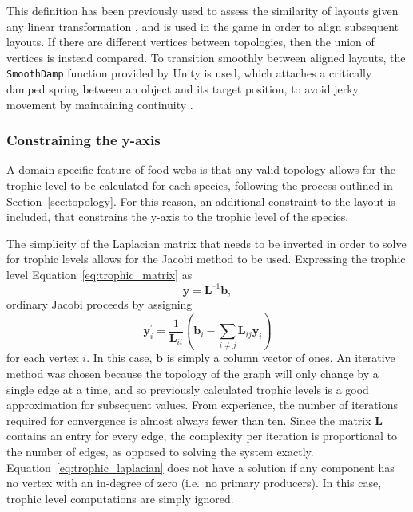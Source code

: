 This definition has been previously used to assess the similarity of layouts given any linear transformation \cite{Ortmann2017}, and is used in the game in order to align subsequent layouts. If there are different vertices between topologies, then the union of vertices is instead compared.
To transition smoothly between aligned layouts, the \texttt{SmoothDamp} function provided by Unity is used, which attaches a critically damped spring between an object and its target position, to avoid jerky movement by maintaining continuity \cite{Kirmse2004}.


\subsubsection{Constraining the y-axis}
A domain-specific feature of food webs is that any valid topology allows for the trophic level to be calculated for each species, following the process outlined in Section~\ref{sec:topology}. For this reason, an additional constraint to the layout is included, that constrains the y-axis to the trophic level of the species.

The simplicity of the Laplacian matrix that needs to be inverted in order to solve for trophic levels allows for the Jacobi method to be used. Expressing the trophic level Equation~\eqref{eq:trophic_matrix} as 
\begin{equation}
  \mathbf{y} = \mathbf{L}^{\text{--}1}\mathbf{b},
  \label{eq:trophic_laplacian}
\end{equation}
ordinary Jacobi proceeds by assigning
\begin{equation}
  \mathbf{y}_i^\prime = \frac{1}{\mathbf{L}_{ii}}\left(\mathbf{b}_i - \sum_{i\neq j}\mathbf{L}_{ij}\mathbf{y}_i\right)
\end{equation}
for each vertex $i$. In this case, $\mathbf{b}$ is simply a column vector of ones.
An iterative method was chosen because the topology of the graph will only change by a single edge at a time, and so previously calculated trophic levels is a good approximation for subsequent values. From experience, the number of iterations required for convergence is almost always fewer than ten. Since the matrix $\mathbf{L}$ contains an entry for every edge, the complexity per iteration is proportional to the number of edges, as opposed to solving the system exactly. 
Equation~\eqref{eq:trophic_laplacian} does not have a solution if any component has no vertex with an in-degree of zero (i.e.\ no primary producers). In this case, trophic level computations are simply ignored.

